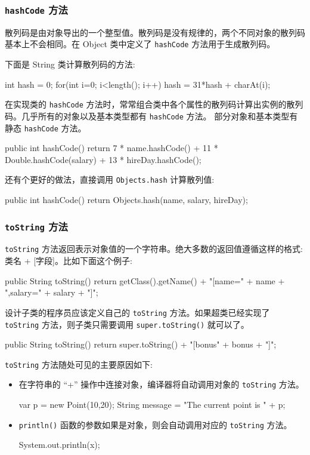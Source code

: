 \subsubsection{\texttt{hashCode} 方法}

散列码是由对象导出的一个整型值。散列码是没有规律的，两个不同对象的散列码基本上不会相同。在 Object 类中定义了 \texttt{hashCode} 方法用于生成散列码。

下面是 String 类计算散列码的方法:
\begin{Java}
int hash = 0;
for(int i=0; i<length(); i++)
    hash = 31*hash + charAt(i);
\end{Java}

在实现类的 \texttt{hashCode} 方法时，常常组合类中各个属性的散列码计算出实例的散列码。几乎所有的对象以及基本类型都有 \texttt{hashCode} 方法。 部分对象和基本类型有静态 \texttt{hashCode} 方法。

\begin{Java}
public int hashCode() {
    return 7 * name.hashCode() + 11 * Double.hashCode(salary) + 13 * hireDay.hashCode();
}
\end{Java}

还有个更好的做法，直接调用 \texttt{Objects.hash} 计算散列值:
\begin{Java}
public int hashCode() {
    return Objects.hash(name, salary, hireDay);
}
\end{Java}

\subsubsection{\texttt{toString} 方法}

\texttt{toString} 方法返回表示对象值的一个字符串。绝大多数的返回值遵循这样的格式: 类名 + [字段]。比如下面这个例子:
\begin{Java}
public String toString() {
    return getClass().getName() + "[name=" + name + ",salary=" + salary + "]";
}
\end{Java}

设计子类的程序员应该定义自己的 \texttt{toString} 方法。如果超类已经实现了 \texttt{toString} 方法，则子类只需要调用 \texttt{super.toString()} 就可以了。
\begin{Java}
public String toString() {
    return super.toString() + "[bonus" + bonus + "]";
}
\end{Java}

\texttt{toString} 方法随处可见的主要原因如下:
\begin{itemize}
    \item 在字符串的 ``+'' 操作中连接对象，编译器将自动调用对象的 \texttt{toString} 方法。
\begin{Java}
var p = new Point(10,20);
String message = "The current point is " + p;
\end{Java}
    \item \texttt{println()} 函数的参数如果是对象，则会自动调用对应的 \texttt{toString} 方法。
\begin{Java}
System.out.println(x);
\end{Java}
\end{itemize}

